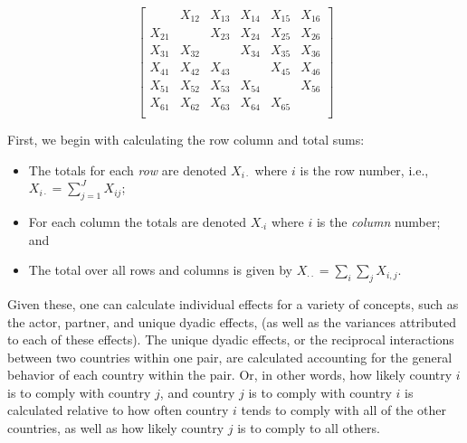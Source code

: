 \singlespacing
\[
\left[
\begin{array}{cccccc}
 & X_{12}  & X_{13}  & X_{14} & X_{15} & X_{16} \\
X_{21}  &  & X_{23}  & X_{24} & X_{25} & X_{26} \\
X_{31}  & X_{32}  &    & X_{34} & X_{35} & X_{36} \\
X_{41}  & X_{42}  & X_{43}  &  & X_{45} & X_{46} \\
X_{51}  & X_{52}  & X_{53}  & X_{54} &   & X_{56} \\
X_{61}  & X_{62}  & X_{63}  & X_{64} & X_{65} &   \\
\end{array}
\right]
\]

\doublespacing
First, we begin with calculating the row column and total sums:
\begin{itemize}
\item The totals for each \emph{ row} are denoted $X_{i \cdot}$ where $i$ is the row number, i.e.,
~\\
$X_{i \cdot} = \sum_{j=1}^{J} X_{ij}$;
\item For each column the totals are denoted
 $X_{\cdot i}$ where $i$ is the \emph{column} number; and 
 \item The total over all rows and columns is given by $X_{\cdot \cdot} = \sum_i \sum_j X_{i,j}$.
 \end{itemize}
 
Given these, one can calculate individual effects for a variety of concepts, such as the actor, partner, and unique dyadic effects, (as well as the variances attributed to each of these effects). The unique dyadic effects, or the reciprocal interactions between two countries within one pair, are calculated accounting for the general behavior of each country within the pair. Or, in other words, how likely country $i$ is to comply with country $j$, and country $j$ is to comply with country $i$ is calculated relative to how often country $i$ tends to comply with all of the other countries, as well as how likely country $j$ is to comply to all others. 

